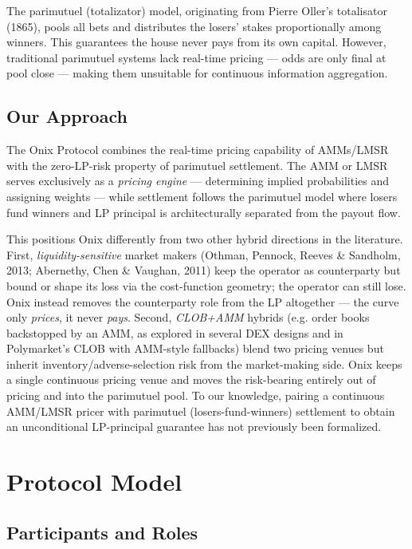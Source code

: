 \documentclass{ledger}
\theoremstyle{plain}
\theoremstyle{remark}
\begin{document}
The parimutuel (totalizator) model, originating from Pierre Oller's totalisator
(1865), pools all bets and distributes the losers' stakes proportionally among
winners. This guarantees the house never pays from its own capital. However,
traditional parimutuel systems lack real-time pricing --- odds are only final at
pool close --- making them unsuitable for continuous information aggregation.

\subsection{Our Approach}

The Onix Protocol combines the real-time pricing capability of AMMs/LMSR with
the zero-LP-risk property of parimutuel settlement. The AMM or LMSR serves
exclusively as a \emph{pricing engine} --- determining implied probabilities and
assigning weights --- while settlement follows the parimutuel model where losers
fund winners and LP principal is architecturally separated from the payout flow.

This positions Onix differently from two other hybrid directions in the
literature. First, \emph{liquidity-sensitive} market makers (Othman, Pennock,
Reeves \& Sandholm, 2013; Abernethy, Chen \& Vaughan, 2011) keep the operator as
counterparty but bound or shape its loss via the cost-function geometry; the
operator can still lose. Onix instead removes the counterparty role from the LP
altogether --- the curve only \emph{prices}, it never \emph{pays}. Second,
\emph{CLOB+AMM} hybrids (e.g. order books backstopped by an AMM, as explored in
several DEX designs and in Polymarket's CLOB with AMM-style fallbacks) blend two
pricing venues but inherit inventory/adverse-selection risk from the
market-making side. Onix keeps a single continuous pricing venue and moves the
risk-bearing entirely out of pricing and into the parimutuel pool. To our
knowledge, pairing a continuous AMM/LMSR pricer with parimutuel
(losers-fund-winners) settlement to obtain an unconditional LP-principal
guarantee has not previously been formalized.

\section{Protocol Model}\label{sec:model}

\subsection{Participants and Roles}
\end{document}
